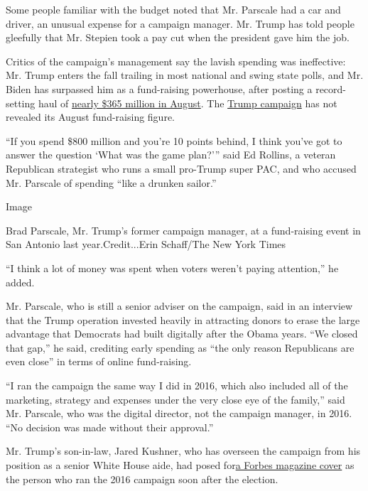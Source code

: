 Some people familiar with the budget noted that Mr. Parscale had a car
and driver, an unusual expense for a campaign manager. Mr. Trump has
told people gleefully that Mr. Stepien took a pay cut when the president
gave him the job.

Critics of the campaign's management say the lavish spending was
ineffective: Mr. Trump enters the fall trailing in most national and
swing state polls, and Mr. Biden has surpassed him as a fund-raising
powerhouse, after posting a record-setting haul of
\href{https://www.nytimes3xbfgragh.onion/live/2020/09/02/us/trump-vs-biden\#biden-shatters-fund-raising-records-with-a-364-5-million-haul-in-august}{nearly
\$365 million in August}. The
\href{https://www.nytimes3xbfgragh.onion/2020/09/10/us/politics/trump-campaign-virus-woodward.html}{Trump
campaign} has not revealed its August fund-raising figure.

``If you spend \$800 million and you're 10 points behind, I think you've
got to answer the question `What was the game plan?''' said Ed Rollins,
a veteran Republican strategist who runs a small pro-Trump super PAC,
and who accused Mr. Parscale of spending ``like a drunken sailor.''

Image

Brad Parscale, Mr. Trump's former campaign manager, at a fund-raising
event in San Antonio last year.Credit...Erin Schaff/The New York Times

``I think a lot of money was spent when voters weren't paying
attention,'' he added.

Mr. Parscale, who is still a senior adviser on the campaign, said in an
interview that the Trump operation invested heavily in attracting donors
to erase the large advantage that Democrats had built digitally after
the Obama years. ``We closed that gap,'' he said, crediting early
spending as ``the only reason Republicans are even close'' in terms of
online fund-raising.

``I ran the campaign the same way I did in 2016, which also included all
of the marketing, strategy and expenses under the very close eye of the
family,'' said Mr. Parscale, who was the digital director, not the
campaign manager, in 2016. ``No decision was made without their
approval.''

Mr. Trump's son-in-law, Jared Kushner, who has overseen the campaign
from his position as a senior White House aide, had posed
for\href{https://www.forbes.com/sites/stevenbertoni/2016/11/22/exclusive-interview-how-jared-kushner-won-trump-the-white-house/\#2fce288a3af6}{a
Forbes magazine cover} as the person who ran the 2016 campaign soon
after the election.

